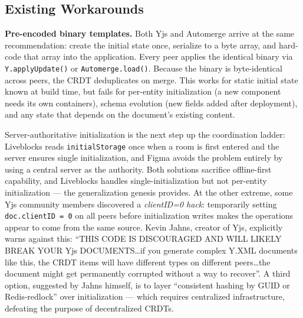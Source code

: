 \subsection{Existing Workarounds}

\textbf{Pre-encoded binary templates.} Both Yjs\cite{yjs:forum:offlineinit} and Automerge\cite{automerge:modeling} arrive at the same recommendation: create the initial state once, serialize to a byte array, and hard-code that array into the application. Every peer applies the identical binary via \texttt{Y.applyUpdate()} or \texttt{Automerge.load()}. Because the binary is byte-identical across peers, the CRDT deduplicates on merge. This works for static initial state known at build time, but fails for per-entity initialization (a new component needs its own containers), schema evolution (new fields added after deployment), and any state that depends on the document's existing content.

Server-authoritative initialization is the next step up the coordination ladder: Liveblocks reads \texttt{initialStorage} once when a room is first entered and the server ensures single initialization\cite{liveblocks:initial}, and Figma avoids the problem entirely by using a central server as the authority\cite{figma:multiplayer}. Both solutions sacrifice offline-first capability, and Liveblocks handles single-initialization but not per-entity initialization --- the generalization genesis provides. At the other extreme, some Yjs community members discovered a \emph{clientID=0 hack}: temporarily setting \texttt{doc.clientID = 0} on all peers before initialization writes makes the operations appear to come from the same source. Kevin Jahns, creator of Yjs, explicitly warns against this: ``THIS CODE IS DISCOURAGED AND WILL LIKELY BREAK YOUR Yjs DOCUMENTS\ldots if you generate complex Y.XML documents like this, the CRDT items will have different types on different peers\ldots the document might get permanently corrupted without a way to recover''\cite{yjs:forum:offlineinit}. A third option, suggested by Jahns himself, is to layer ``consistent hashing by GUID or Redis-redlock''\cite{yjs:forum:offlineinit} over initialization --- which requires centralized infrastructure, defeating the purpose of decentralized CRDTs.

